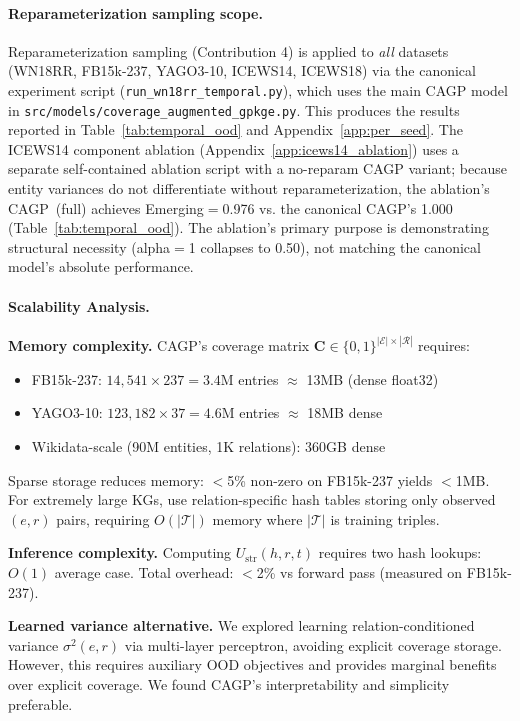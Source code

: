 \documentclass{article}
\newcommand{\mat}[1]{\mathbf{#1}}
\begin{document}
\paragraph{Reparameterization sampling scope.}
Reparameterization sampling (Contribution 4) is applied to \emph{all} datasets (WN18RR, FB15k-237, YAGO3-10, ICEWS14, ICEWS18) via the canonical experiment script (\texttt{run\_wn18rr\_temporal.py}), which uses the main CAGP model in \texttt{src/models/coverage\_augmented\_gpkge.py}. This produces the results reported in Table~\ref{tab:temporal_ood} and Appendix~\ref{app:per_seed}. The ICEWS14 component ablation (Appendix~\ref{app:icews14_ablation}) uses a separate self-contained ablation script with a no-reparam CAGP variant; because entity variances do not differentiate without reparameterization, the ablation's CAGP~(full) achieves Emerging$=$0.976 vs. the canonical CAGP's 1.000 (Table~\ref{tab:temporal_ood}). The ablation's primary purpose is demonstrating structural necessity (alpha$=$1 collapses to 0.50), not matching the canonical model's absolute performance.

\paragraph{Scalability Analysis.}
\textbf{Memory complexity.} CAGP's coverage matrix $\mat{C} \in \{0,1\}^{|\mathcal{E}| \times |\mathcal{R}|}$ requires:
\begin{itemize}
\item FB15k-237: $14{,}541 \times 237 = 3.4$M entries $\approx$ 13MB (dense float32)
\item YAGO3-10: $123{,}182 \times 37 = 4.6$M entries $\approx$ 18MB dense
\item Wikidata-scale (90M entities, 1K relations): 360GB dense
\end{itemize}
Sparse storage reduces memory: $<$5\% non-zero on FB15k-237 yields $<$1MB. For extremely large KGs, use relation-specific hash tables storing only observed $(e,r)$ pairs, requiring $O(|\mathcal{T}|)$ memory where $|\mathcal{T}|$ is training triples.

\textbf{Inference complexity.} Computing $U_{\text{str}}(h,r,t)$ requires two hash lookups: $O(1)$ average case. Total overhead: $<$2\% vs forward pass (measured on FB15k-237).

\textbf{Learned variance alternative.} We explored learning relation-conditioned variance $\sigma^2(e,r)$ via multi-layer perceptron, avoiding explicit coverage storage. However, this requires auxiliary OOD objectives and provides marginal benefits over explicit coverage. We found CAGP's interpretability and simplicity preferable.
\end{document}
